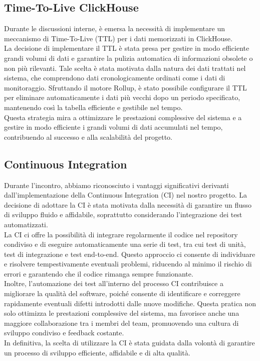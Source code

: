 \documentclass{article}
\begin{document}
    \subsection{Time-To-Live ClickHouse}
    Durante le discussioni interne, è emersa la necessità di implementare un meccanismo di Time-To-Live (TTL) per i dati memorizzati in ClickHouse.\\
    La decisione di implementare il TTL è stata presa per gestire in modo efficiente grandi volumi di dati e garantire la pulizia automatica di informazioni obsolete o non più rilevanti. Tale scelta è stata motivata dalla natura dei dati trattati nel sistema, che comprendono dati cronologicamente ordinati come i dati di monitoraggio. Sfruttando il motore Rollup, è stato possibile configurare il TTL per eliminare automaticamente i dati più vecchi dopo un periodo specificato, mantenendo così la tabella efficiente e gestibile nel tempo.\\
    Questa strategia mira a ottimizzare le prestazioni complessive del sistema e a gestire in modo efficiente i grandi volumi di dati accumulati nel tempo, contribuendo al successo e alla scalabilità del progetto.    

    \subsection{Continuous Integration}
    Durante l'incontro, abbiamo riconosciuto i vantaggi significativi derivanti dall'implementazione della Continuous Integration (CI) nel nostro progetto. La decisione di adottare la CI è stata motivata dalla necessità di garantire un flusso di sviluppo fluido e affidabile, soprattutto considerando l'integrazione dei test automatizzati.\\
    La CI ci offre la possibilità di integrare regolarmente il codice nel repository condiviso e di eseguire automaticamente una serie di test, tra cui test di unità, test di integrazione e test end-to-end. Questo approccio ci consente di individuare e risolvere tempestivamente eventuali problemi, riducendo al minimo il rischio di errori e garantendo che il codice rimanga sempre funzionante.\\
    Inoltre, l'automazione dei test all'interno del processo CI contribuisce a migliorare la qualità del software, poiché consente di identificare e correggere rapidamente eventuali difetti introdotti dalle nuove modifiche. Questa pratica non solo ottimizza le prestazioni complessive del sistema, ma favorisce anche una maggiore collaborazione tra i membri del team, promuovendo una cultura di sviluppo condiviso e feedback costante.\\
    In definitiva, la scelta di utilizzare la CI è stata guidata dalla volontà di garantire un processo di sviluppo efficiente, affidabile e di alta qualità.
\end{document}
